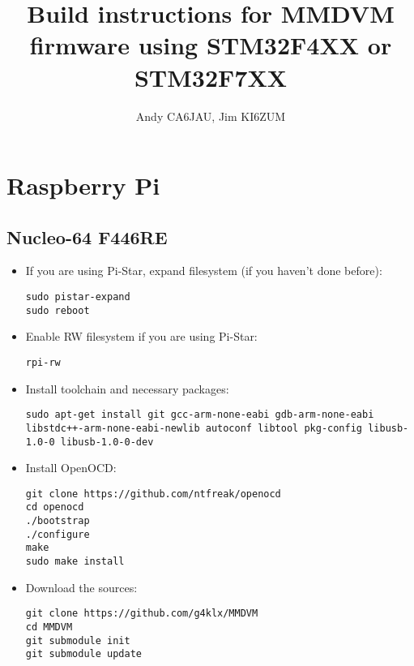 \documentclass[]{article}
\title{Build instructions for MMDVM firmware using STM32F4XX or STM32F7XX}
\author{Andy CA6JAU, Jim KI6ZUM}
\begin{document}
\maketitle
\tableofcontents

\section{Raspberry Pi}

\subsection{Nucleo-64 F446RE}

\begin{itemize}[leftmargin=*]
	
\item If you are using Pi-Star, expand filesystem (if you haven't done before):

\begin{lstlisting}[style=DOS]
sudo pistar-expand
sudo reboot
\end{lstlisting}

\item Enable RW filesystem if you are using Pi-Star:
\begin{lstlisting}[style=DOS]
rpi-rw
\end{lstlisting}

\item Install toolchain and necessary packages:

\begin{lstlisting}[style=DOS]
sudo apt-get install git gcc-arm-none-eabi gdb-arm-none-eabi libstdc++-arm-none-eabi-newlib autoconf libtool pkg-config libusb-1.0-0 libusb-1.0-0-dev
\end{lstlisting}

\item Install OpenOCD:

\begin{lstlisting}[style=DOS]
git clone https://github.com/ntfreak/openocd
cd openocd
./bootstrap
./configure
make
sudo make install
\end{lstlisting}

\item Download the sources:

\begin{lstlisting}[style=DOS]
git clone https://github.com/g4klx/MMDVM
cd MMDVM
git submodule init
git submodule update
\end{lstlisting}


\end{itemize}
\end{document}
